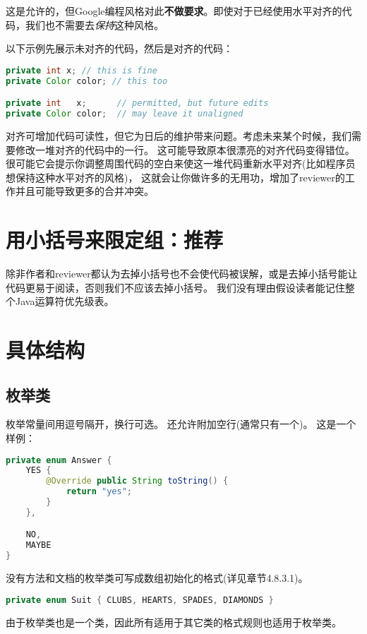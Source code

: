 \documentclass[cn,11pt,chinese]{elegantbook}
\begin{document}
这是允许的，但Google编程风格对此\textbf{不做要求}。即使对于已经使用水平对齐的代码，我们也不需要去\emph{保持}这种风格。

以下示例先展示未对齐的代码，然后是对齐的代码：
\begin{lstlisting}[language=java]
private int x; // this is fine
private Color color; // this too

private int   x;      // permitted, but future edits
private Color color;  // may leave it unaligned
\end{lstlisting}

\begin{remark}
	对齐可增加代码可读性，但它为日后的维护带来问题。考虑未来某个时候，我们需要修改一堆对齐的代码中的一行。 这可能导致原本很漂亮的对齐代码变得错位。很可能它会提示你调整周围代码的空白来使这一堆代码重新水平对齐(比如程序员想保持这种水平对齐的风格)， 这就会让你做许多的无用功，增加了reviewer的工作并且可能导致更多的合并冲突。
\end{remark}

\section{用小括号来限定组：推荐}
除非作者和reviewer都认为去掉小括号也不会使代码被误解，或是去掉小括号能让代码更易于阅读，否则我们不应该去掉小括号。 我们没有理由假设读者能记住整个Java运算符优先级表。

\section{具体结构}
\subsection{枚举类}
枚举常量间用逗号隔开，换行可选。 还允许附加空行(通常只有一个)。 这是一个样例：
\begin{lstlisting}[language=java]
private enum Answer {
	YES {
		@Override public String toString() {
			return "yes";
		}
	},

	NO,
	MAYBE
}
\end{lstlisting}

没有方法和文档的枚举类可写成数组初始化的格式(详见章节4.8.3.1)。
\begin{lstlisting}[language=java]
private enum Suit { CLUBS, HEARTS, SPADES, DIAMONDS }
\end{lstlisting}

由于枚举类也是一个类，因此所有适用于其它类的格式规则也适用于枚举类。
\end{document}
